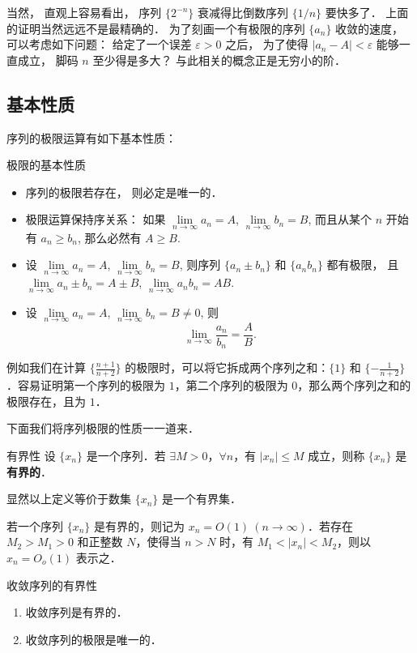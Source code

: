 当然， 直观上容易看出， 序列 $\{2^{-n}\}$ 衰减得比倒数序列 $\{1/n\}$ 要快多了． 上面的证明当然远远不是最精确的． 为了刻画一个有极限的序列 $\{a_n\}$ 收敛的速度， 可以考虑如下问题： 给定了一个误差 $\varepsilon>0$ 之后， 为了使得 $|a_n-A|<\varepsilon$ 能够一直成立， 脚码 $n$ 至少得是多大？ 与此相关的概念正是无穷小的阶．

\subsection{基本性质}
序列的极限运算有如下基本性质：

\begin{theorem}{极限的基本性质}
\begin{itemize}
\item 序列的极限若存在， 则必定是唯一的．
\item 极限运算保持序关系： 如果 $\lim\limits_{n\to\infty}a_n=A$, $\lim\limits_{n\to\infty}b_n=B$, 而且从某个 $n$ 开始有 $a_n\geq b_n$, 那么必然有 $A\geq B$.
\item 设 $\lim\limits_{n\to\infty}a_n=A$, $\lim\limits_{n\to\infty}b_n=B$, 则序列 $\{a_n\pm b_n\}$ 和 $\{a_n b_n\}$ 都有极限， 且 $\lim\limits_{n\to\infty}a_n\pm b_n=A\pm B$, $\lim\limits_{n\to\infty}a_nb_n=AB$.
\item 设 $\lim\limits_{n\to\infty}a_n=A$, $\lim\limits_{n\to\infty}b_n=B\neq0$, 则
$$
\lim\limits_{n\to\infty}\frac{a_n}{b_n}=\frac{A}{B}.
$$
\end{itemize}
\end{theorem}

例如我们在计算 $\{\frac{n+1}{n+2}\}$ 的极限时，可以将它拆成两个序列之和：$\{1\}$ 和 $\{-\frac{1}{n+2}\}$．容易证明第一个序列的极限为 $1$，第二个序列的极限为 $0$，那么两个序列之和的极限存在，且为 $1$．

下面我们将序列极限的性质一一道来．

\begin{definition}{有界性}
设 $\{x_n\}$ 是一个序列．若 $\exists M>0$，$\forall n$，有 $|x_n|\leq M$ 成立，则称 $\{x_n\}$ 是\textbf{有界的}．

显然以上定义等价于数集 $\{x_n\}$ 是一个有界集．

若一个序列 $\{x_n\}$ 是有界的，则记为 $x_n=O(1)\ (n\rightarrow \infty)$．若存在 $M_2>M_1>0$ 和正整数 $N$，使得当 $n>N$ 时，有 $M_1<|x_n|<M_2$，则以 $x_n=O_o(1)$ 表示之．
\end{definition}
  
\begin{theorem}{收敛序列的有界性}
\begin{enumerate}
\item 收敛序列是有界的．
\item 收敛序列的极限是唯一的．
\end{enumerate}
\end{theorem}

